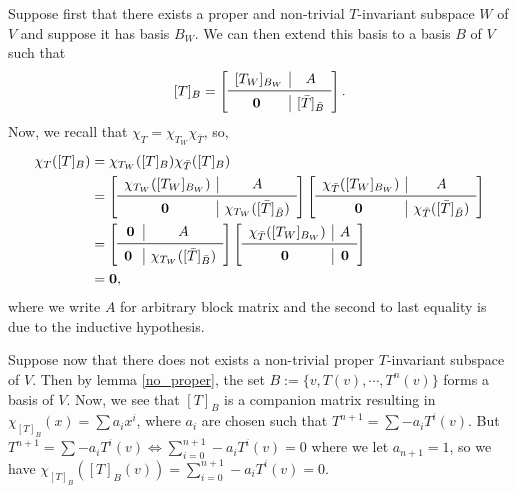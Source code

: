 \documentclass[
]{article}
\theoremstyle{definition}
\theoremstyle{definition}
\begin{document}
Suppose first that there exists a proper and non-trivial \(T\)-invariant
subspace \(W\) of \(V\) and suppose it has basis \(B_W\). We can then
extend this basis to a basis \(B\) of \(V\) such that \[[T]_B = 
    \left[
      \begin{array}{c|c}
        [T_W]_{B_W} & A \\
        \midrule
        \mathbf{0} & [\bar{T}]_{\bar{B}}
      \end{array}
      \right]. \] Now, we recall that
\(\chi_T = \chi_{T_W} \chi_{\bar{T}}\), so, \begin{align*}
    \chi_T([T]_B) & = \chi_{T_W}([T]_B) \chi_{\bar{T}}([T]_B)\\
    & = 
    \left[
      \begin{array}{c|c}
        \chi_{T_W}([T_W]_{B_W}) & A \\
        \midrule
        \mathbf{0} & \chi_{T_W}([\bar{T}]_{\bar{B}})
      \end{array}
    \right]
    \left[
      \begin{array}{c|c}
        \chi_{\bar{T}}([T_W]_{B_W}) & A \\
        \midrule
        \mathbf{0} & \chi_{\bar{T}}([\bar{T}]_{\bar{B}})
      \end{array}
    \right]\\
    & = 
    \left[
      \begin{array}{c|c}
        \mathbf{0} & A \\
        \midrule
        \mathbf{0} & \chi_{T_W}([\bar{T}]_{\bar{B}})
      \end{array}
    \right]
    \left[
      \begin{array}{c|c}
        \chi_{\bar{T}}([T_W]_{B_W}) & A \\
        \midrule
        \mathbf{0} & \mathbf{0}
      \end{array}
    \right]\\
    & = \mathbf{0},
  \end{align*} where we write \(A\) for arbitrary block matrix and the
second to last equality is due to the inductive hypothesis.

Suppose now that there does not exists a non-trivial proper
\(T\)-invariant subspace of \(V\). Then by lemma \ref{no_proper}, the
set \(B := \{v, T(v), \cdots, T^n(v)\}\) forms a basis of \(V\). Now, we
see that \([T]_B\) is a companion matrix resulting in
\(\chi_{[T]_B}(x) = \sum a_i x^i\), where \(a_i\) are chosen such that
\(T^{n + 1} = \sum -a_i T^i(v)\). But
\(T^{n + 1} = \sum -a_i T^i(v) \iff \sum_{i = 0}^{n + 1} -a_i T^i(v) = 0\)
where we let \(a_{n + 1} = 1\), so we have
\(\chi_{[T]_B}([T]_B(v)) =  \sum_{i = 0}^{n + 1} -a_i T^i(v) = 0\).
\end{document}
